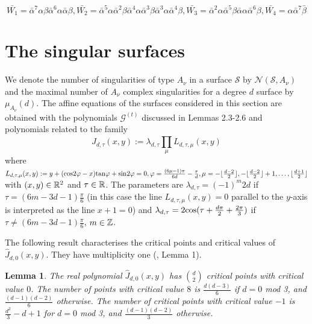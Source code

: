 \documentclass{birkjour_t2}
\newtheorem{lem}[thm]{Lemma}
\theoremstyle{definition}
\theoremstyle{remark}
\numberwithin{equation}{section}
\begin{document}
$$\bar{W_{1}}= \bar{\alpha}^7\alpha\beta\bar{\alpha}^6\alpha\bar{\alpha}\beta,  \bar{W_{2}}= \bar{\alpha}^5\alpha\bar{\alpha}^2\beta\bar{\alpha}^4\alpha\bar{\alpha}^3\beta\bar{\alpha}^3\alpha\bar{\alpha}^4\beta, \bar{W_{3}}= \bar{\alpha}^2\alpha \bar{\alpha}^5\beta\bar{\alpha}\alpha\bar{\alpha}^6\beta, 
\bar{W_{4}}= \alpha\bar{\alpha}^7\bar{\beta}$$
               
 \section{The singular surfaces}
 \bigskip\par
We denote the number of singularities of type $A_{\nu}$ in a surface $\mathcal{S}$  by $\mathcal{N}(\mathcal{S},A_{\nu})$  and the maximal number of $A_{\nu}$ complex singularities for a degree $d$ surface by $\mu_{A_{\nu}}(d)$. The affine equations of the surfaces considered in this section are obtained with the polynomials  ${\mathcal{G}}^{(t)}$ discussed in Lemmas 2.3-2.6 and polynomials related to the family 
    \begin{equation} 
\hat{J}_{d,\tau}(x, y):=\lambda_{d, \tau}  \prod_{\mu} L_{d, \tau, \mu}\left(x, y\right)
   \end{equation} 
   where  $L_{d,\tau,\mu}(x,y):=y+({\rm cos}2\varphi-x){\rm tan}\varphi+{\rm sin}2\varphi=0, \varphi=\frac{(6\mu-1)\pi }{6d}-\frac{\tau}{d}, \mu=- \lfloor \frac{d-2}{2} \rfloor,- \lfloor \frac{d-2}{2} \rfloor+1,\dots , \lfloor \frac{d+1}{2} \rfloor$ with $(x,y)\in {\Bbb{R}}^2$ and $\tau \in \Bbb{R}$. The parameters are $\lambda_{d,\tau} =(-1)^{m}2 d$ if $\tau = (6m-3d-1)\frac{\pi}{6}$ (in this case the line  $L_{d,\tau,\mu}(x,y)=0$ parallel to the $y$-axis is interpreted as the line $x+1=0$) and  $\lambda_{d,\tau}  = 2{\rm cos}(\tau+\frac{d\pi}{2}+\frac{2\pi}{3})$ if $\tau \neq (6m-3d-1)\frac{\pi}{6}$, $m \in \Bbb{Z}$.
  \par
The following result characterises the critical points and critical values of  $\hat{J}_{d,0}(x, y)$. They have multiplicity one  (\cite{esc16}, Lemma 1).

    \begin{lem}  The real polynomial $\hat{J}_{d,0}(x, y)$ has ${d \choose 2}$ critical points with critical value $0$. The number of points with critical value $8$ is $\frac{d(d-3)}{6}$ if $d=0$ mod 3, and $\frac{(d-1)(d-2)}{6}$ otherwise. The number of critical points with critical value $-1$ is $\frac{d^{2}}{3}-d+1$ for $d=0$ mod 3, and $\frac{(d-1)(d-2)}{3}$ otherwise. 
     \end{lem}
\end{document}
